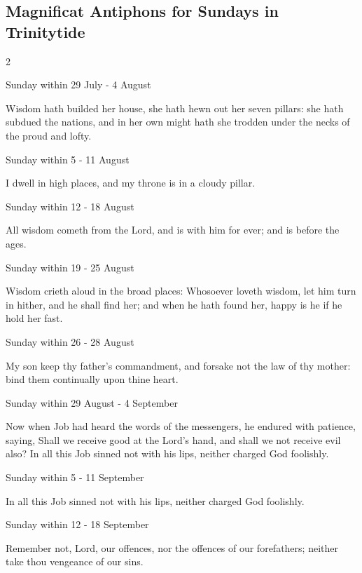 \subsection{{\color{GreenSeason}Magnificat Antiphons for Sundays in Trinitytide}}
\fancyhead[RE,LO]{}
\begin{multicols}{2}
\begin{inhead}
Sunday within 29 July - 4 August
\end{inhead}\par\noindent
Wisdom hath builded her house, {\dag} she hath hewn out her seven pillars: she hath subdued the nations, and in her own might hath she trodden under the necks of the proud and lofty.

\begin{inhead}
Sunday within 5 - 11 August
\end{inhead}\par\noindent
I dwell {\dag} in high places, and my throne is in a cloudy pillar.
\begin{inhead}
Sunday within 12 - 18 August
\end{inhead}\par\noindent
All wisdom {\dag} cometh from the Lord, and is with him for ever; and is before the ages.

\begin{inhead}
Sunday within 19 - 25 August
\end{inhead}\par\noindent
Wisdom crieth {\dag} aloud in the broad places: Whosoever loveth wisdom, let him turn in hither, and he shall find her; and when he hath found her, happy is he if he hold her fast.
\begin{inhead}
Sunday within 26 - 28 August
\end{inhead}\par\noindent
My son {\dag} keep thy father's commandment, and forsake not the law of thy mother: bind them continually upon thine heart.
\begin{inhead}
Sunday within 29 August - 4 September
\end{inhead}\par\noindent
Now when Job had heard {\dag} the words of the messengers, he endured with patience, saying, Shall we receive good at the Lord's hand, and shall we not receive evil also? In all this Job sinned not with his lips, neither charged God foolishly.
\begin{inhead}
Sunday within 5 - 11 September
\end{inhead}\par\noindent
In all this {\dag} Job sinned not with his lips, neither charged God foolishly.
\begin{inhead}
Sunday within 12 - 18 September
\end{inhead}\par\noindent
Remember not, {\dag} Lord, our offences, nor the offences of our forefathers; neither take thou vengeance of our sins.


\end{multicols}
